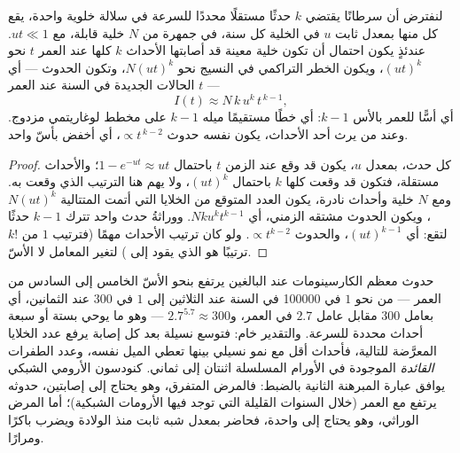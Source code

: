 \begin{theorem}\label{thm:b3:cancer-biology:armitage-doll}
لنفترض أن سرطانًا يقتضي $k$ حدثًا مستقلًا محددًا للسرعة في سلالة
خلوية واحدة، يقع كل منها بمعدل ثابت $u$ في الخلية كل سنة،
في جمهرة من $N$ خلية قابلة، مع $ut \ll 1$. عندئذٍ يكون
احتمال أن تكون خلية معينة قد أصابتها الأحداث $k$ كلها عند العمر $t$
نحو $(ut)^{k}$، ويكون الخطر التراكمي في النسيج نحو $N(ut)^{k}$،
وتكون الحدوث --- أي الحالات الجديدة في السنة عند العمر $t$ ---
\[
I(t) \approx N\,k\,u^{k}\,t^{\,k-1},
\]
أي أسًّا للعمر بالأس $k - 1$: أي خطًا مستقيمًا ميله $k - 1$
على مخطط لوغاريتمي مزدوج. وعند من يرث أحد الأحداث،
يكون  نفسه حدوث $\propto t^{\,k-2}$، أي أخفض بأسّ واحد.
\end{theorem}
\begin{proof}
كل حدث، بمعدل $u$، يكون قد وقع عند الزمن $t$ باحتمال
$1 - e^{-ut} \approx ut$؛ والأحداث مستقلة، فتكون قد وقعت كلها $k$
باحتمال $(ut)^{k}$، ولا يهم هنا الترتيب الذي
وقعت به. ومع $N$ خلية وأحداث نادرة، يكون
العدد المتوقع من الخلايا التي أتمت المتتالية
$N(ut)^{k}$، ويكون الحدوث مشتقه الزمني، أي $Nku^{k}t^{k-1}$.
ووراثةُ حدث واحد تترك $k - 1$ حدثًا لتقع: أي $(ut)^{k-1}$، والحدوث
$\propto t^{k-2}$. ولو كان ترتيب الأحداث مهمًا (فترتيب $1$ من $k!$
ترتيبًا هو الذي يقود إلى ) لتغير المعامل لا الأسّ.
\end{proof}

\begin{example}\label{ex:b3:cancer-biology:exponent}
حدوث معظم الكارسينومات عند البالغين يرتفع بنحو الأسّ الخامس إلى
السادس من العمر --- من نحو $1$ في \num{100000} في السنة عند
الثلاثين إلى $1$ في $300$ عند الثمانين، أي بعامل $300$ مقابل عامل $2.7$
في العمر، و$2.7^{5.7} \approx 300$ --- وهو ما يوحي بستة أو سبعة
أحداث محددة للسرعة. والتقدير خام: فتوسع نسيلة
بعد كل إصابة يرفع عدد الخلايا المعرَّضة للتالية، فأحداث أقل
مع نمو نسيلي بينها تعطي الميل نفسه، وعدد
الطفرات \emph{القائدة} الموجودة في الأورام المسلسلة اثنتان إلى
ثماني.  كنودسون الأرومي الشبكي يوافق عبارة المبرهنة الثانية
بالضبط: فالمرض المتفرق، وهو يحتاج إلى إصابتين، حدوثه
يرتفع مع العمر (خلال السنوات القليلة التي توجد فيها الأرومات الشبكية)؛ أما
المرض الوراثي، وهو يحتاج إلى واحدة، فحاضر بمعدل شبه ثابت
منذ الولادة ويضرب باكرًا ومرارًا.
\end{example}

